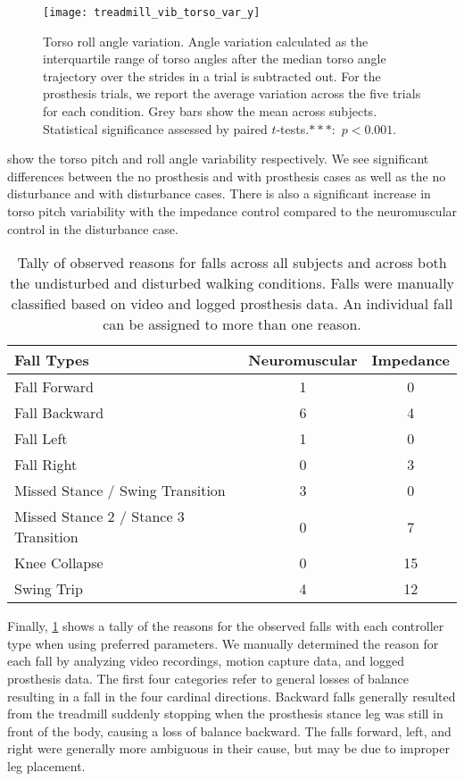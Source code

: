 \begin{figure}[t]
    \centering 
    \texttt{[image: treadmill\_vib\_torso\_var\_y]}
    \caption[Torso roll angle variation]{Torso roll angle variation. Angle
    variation calculated as the interquartile range of torso angles after the
    median torso angle trajectory over the strides in a trial is subtracted out.
    For the prosthesis trials, we report the average variation across the five
    trials for each condition.  Grey bars show the mean across subjects.
    Statistical significance assessed by paired $t$-tests.$***$:~$p <
    0.001$.}\label{fig:treadmill_exp_torso_var_y}
\end{figure}

 show the
torso pitch and roll angle variability respectively. We see significant
differences between the no prosthesis and with prosthesis cases as well as the
no disturbance and with disturbance cases. There is also a significant increase
in torso pitch variability with the impedance control compared to the
neuromuscular control in the disturbance case.

\begin{table}[t]
  \begin{center}
    \begin{tabular}{lcc}
      Fall Types & Neuromuscular & Impedance \\
      \midrule
      Fall Forward &  1 &  0 \\
      Fall Backward &  6 &  4 \\
      Fall Left &  1 &  0 \\
      Fall Right &  0 &  3 \\
      Missed Stance / Swing Transition &  3 &  0 \\
      Missed Stance 2 / Stance 3 Transition &  0 &  7 \\
      Knee Collapse & 0 & 15 \\
      Swing Trip & 4 & 12 \\
    \end{tabular}
  \end{center}
  \caption[Tally of observed reasons for falls]{Tally of observed reasons for
  falls across all subjects and across both the undisturbed and disturbed
  walking conditions. Falls were manually classified based on video and logged
  prosthesis data. An individual fall can be assigned to more than one
  reason.}\label{tab:treadmill_exp_fall_reasons}
\end{table}
Finally, \cref{tab:treadmill_exp_fall_reasons} shows a tally of the reasons for
the observed falls with each controller type when using preferred parameters.
We manually determined the reason for each fall by analyzing video recordings,
motion capture data, and logged prosthesis data. The first four categories refer
to general losses of balance resulting in a fall in the four cardinal
directions. Backward falls generally resulted from the treadmill suddenly
stopping when the prosthesis stance leg was still in front of the body, causing
a loss of balance backward. The falls forward, left, and right were generally
more ambiguous in their cause, but may be due to improper leg placement. 

